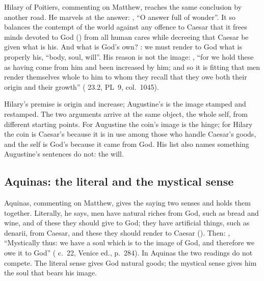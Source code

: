 Hilary of Poitiers, commenting on Matthew, reaches the same conclusion by
another road. He marvels at the answer: , ``O answer full of wonder''. It so balances the contempt of the
world against any offence to Caesar that it frees minds devoted to God
() from all human cares while decreeing that Caesar
be given what is his. And what is God's own? : we must render to
God what is properly his, ``body, soul, will''. His reason is not the image:
,
``for we hold these as having come from him and been increased by him; and so
it is fitting that men render themselves whole to him to whom they recall that
they owe both their origin and their growth'' ( 23.2, PL~9, col.~1045).

Hilary's premise is origin and increase; Augustine's is the image stamped and
restamped. The two arguments arrive at the same object, the whole self, from
different starting points. For Augustine the coin's image is the hinge; for
Hilary the coin is Caesar's because it is in use among those who handle
Caesar's goods, and the self is God's because it came from God. His list also
names something Augustine's sentences do not: the will.

\subsection{Aquinas: the literal and the mystical sense}

Aquinas, commenting on Matthew, gives the saying two senses and holds them
together. Literally, he says, men have natural riches from God, such as bread
and wine, and of these they should give to God; they have artificial things,
such as denarii, from Caesar, and these they should render to Caesar
(). Then: , ``Mystically thus: we have a soul which is
to the image of God, and therefore we owe it to God'' (
c.~22, Venice ed., p.~284). In Aquinas the two readings do not compete. The
literal sense gives God natural goods; the mystical sense gives him the soul
that bears his image.

